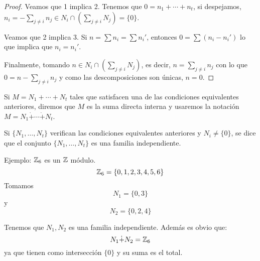 
\begin{proof}
  Veamos que 1 implica 2. Tenemos que \(0=n_1+\cdots+n_t\),
  si despejamos, \(n_i=-\sum_{j\neq i} n_j\in N_i\cap\left(
  \sum_{j\neq i} N_j\right)=\{0\}\).

  Veamos que 2 implica 3. Si \(n=\sum n_i=\sum n_i'\),
  entonces \(0=\sum(n_i-n_i')\) lo que implica que
  \(n_i=n_i'\).

  Finalmente, tomando \(n\in N_i\cap\left(
  \sum_{j\neq i} N_j\right)\), es decir,
  \(n=\sum_{j\neq i}n_j\) con lo que
  \(0=n-\sum_{j\neq i} n_j\) y como las descomposiciones
  son únicas, \(n=0\).
\end{proof}

\begin{df}
  Si \(M=N_1+\cdots+ N_t\) tales que satisfacen una de las condiciones
  equivalentes anteriores, diremos que \(M\) es la suma directa interna
  y usaremos la notación \(M=N_1\dot{+}\cdots\dot{+} N_t\).
\end{df}

\begin{df}
  Si \(\{N_1,\ldots, N_t\}\) verifican las condiciones equivalentes
  anteriores y \(N_i\neq \{0\}\), se dice que el conjunto
  \(\{N_1,\ldots, N_t\}\) es una
  familia independiente.
\end{df}

Ejemplo: \(\mathbb{Z}_6\) es un \(\mathbb{Z}\) módulo.
\[
  \mathbb{Z}_6=\{0,1,2,3,4,5,6\}
\]
Tomamos
\[
  N_1=\{0,3\}
\]
y
\[
  N_2=\{0,2,4\}
\]

Tenemos que \(N_1, N_2\) es una familia independiente. Además es obvio que:
\[
  N_1\dot{+}N_2=\mathbb{Z}_6
\]
ya que tienen como intersección \(\{0\}\) y su suma es el total.

